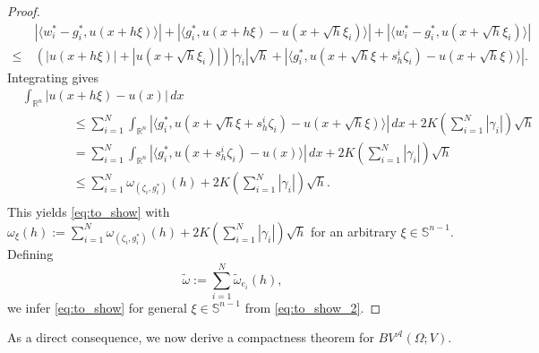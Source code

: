 \documentclass[11pt,reqno]{amsart}
\theoremstyle{plain}
\theoremstyle{definition}
\theoremstyle{remark}
\numberwithin{equation}{section}
\newcommand{\R}{\mathbb{R}}
\newcommand{\s}{\mathbb{S}}
\newcommand{\A}{\mathcal{A}}
\newcommand{\1}{\mathbbm{1}} %
\begin{document}
\begin{proof}
    \begin{align*}
        &|\langle w_i^* - g_i^*, u(x + h\xi)\rangle| + |\langle g_i^*, u(x + h\xi) - u(x + \sqrt h \xi_{i})\rangle| + |\langle w_i^* - g_i^*, u(x + \sqrt h \xi_{i})\rangle| \\
        \leq \ & (|u(x + h\xi)| + |u(x + \sqrt h\xi_i)|)|\gamma_i| \sqrt h + |\langle g_i^*, u(x + \sqrt h \xi + s_h^i \zeta_i) - u(x + \sqrt h \xi) \rangle|.
    \end{align*}
    Integrating gives 
    \begin{align*}
        &\int_{\R^n} |u(x + h\xi) - u(x)| \, dx \\
        & \hspace{4em} \leq \sum_{i = 1}^N \int_{\R^n} |\langle g_i^*, u(x + \sqrt h \xi + s_h^i \zeta_i) - u(x + \sqrt h \xi) \rangle | \, dx + 2 K \left(\sum_{i = 1}^N|\gamma_i| \right)\sqrt h \\
        & \hspace{4em} = \sum_{i = 1}^N \int_{\R^n} |\langle g_i^*, u(x + s_h^i \zeta_i) - u(x) \rangle | \, dx + 2 K \left(\sum_{i = 1}^N|\gamma_i| \right)\sqrt h \\
        & \hspace{4em} \leq \sum_{i = 1}^N \omega_{(\zeta_i, g_i^*)}(h) + 2 K \left(\sum_{i = 1}^N|\gamma_i| \right)\sqrt h. \\
    \end{align*}
    This yields \eqref{eq:to_show} with $\omega_\xi(h) := \sum_{i = 1}^N \omega_{(\zeta_i, g_i^*)}(h) + 2 K \left(\sum_{i = 1}^N|\gamma_i| \right)\sqrt h$ for an arbitrary $\xi \in \s^{n-1}$. Defining 
    \[
        \tilde \omega := \sum_{i = 1}^N \tilde \omega_{e_i}(h),
    \]
    we infer \eqref{eq:to_show} for general $\xi \in \s^{n-1}$ from \eqref{eq:to_show_2}.
\end{proof}

As a direct consequence, we now derive a compactness theorem for $BV^\A(\Omega; V)$.
\end{document}
